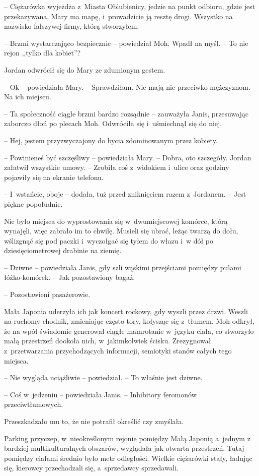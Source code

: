 \documentclass[oneside,polish,11pt,sfheadings]{mwbk}
\begin{document}
-- Ciężarówka wyjeżdża z~Miasta Oblubienicy, jedzie na punkt odbioru,
gdzie jest przekazywana, Mary ma mapę, i~prowadzicie ją resztę drogi.
Wszystko na nazwisko fałszywej firmy, którą stworzyłem.

-- Brzmi wystarczająco bezpiecznie -- powiedział Moh. Wpadł na myśl. -- To
nie rejon ,,tylko dla kobiet''?

Jordan odwrócił się do Mary ze zdumionym gestem.

-- Ok -- powiedziała Mary. -- Sprawdziłam. Nie mają nic przeciwko
mężczyznom. Na ich miejscu.

-- Ta społeczność ciągle brzmi bardzo rozsądnie -- zauważyła Janis,
przesuwając zaborczo dłoń po plecach Moh. Odwróciła się i~uśmiechnął się
do niej.

-- Hej, jestem przyzwyczajony do bycia zdominowanym przez kobiety.

-- Powinieneś być szczęśliwy -- powiedziała Mary. -- Dobra, oto szczegóły.
Jordan załatwił wszystkie umowy. -- Zrobiła coś z~widokiem i~ulice oraz
godziny pojawiły się na ekranie telefonu.

-- I~wstańcie, oboje -- dodała, tuż przed zniknięciem razem z~Jordanem. -- Jest piękne popołudnie.

Nie było miejsca do wyprostowania się w~dwumiejscowej komórce, którą
wynajęli, więc zabrało im to chwilę. Musieli się ubrać, leżąc twarzą do
dołu, wślizgnąć się pod paczki i~wyczołgać się tyłem do włazu i~w dół po
dziesięciometrowej drabinie na ziemię.

-- Dziwne -- powiedziała Janis, gdy szli wąskimi przejściami pomiędzy
pulami łóżko-komórek. -- Jak pozostawiony bagaż.

-- Pozostawieni pasażerowie.

Mała Japonia uderzyła ich jak koncert rockowy, gdy wyszli przez drzwi.
Weszli na ruchomy chodnik, zmieniając często tory, kołysząc się z~tłumem. Moh odkrył, że na wpół świadomie generował ciągłe mamrotanie w~języku ciała, co stworzyło małą przestrzeń dookoła nich, w~jakimkolwiek
ścisku. Zrezygnował z~przetwarzania przychodzących informacji, semiotyki
stanów całych tego miejsca.

-- Nie wygląda uciążliwie -- powiedział. -- To właśnie jest dziwne.

-- Coś w~jedzeniu -- powiedziała Janis. -- Inhibitory feromonów
przeciwtłumowych.

Przeszkadzało mu to, że nie potrafił określić czy zmyślała.

Parking przyczep, w~nieokreślonym rejonie pomiędzy Małą Japonią a~jednym
z bardziej multikulturalnych obszarów, wyglądała jak otwarta przestrzeń.
Tutaj pomiędzy ciałami średnio było metr odległości. Wielkie ciężarówki
stały, ładując się, kierowcy przechadzali się, a~sprzedawcy sprzedawali.
\end{document}
